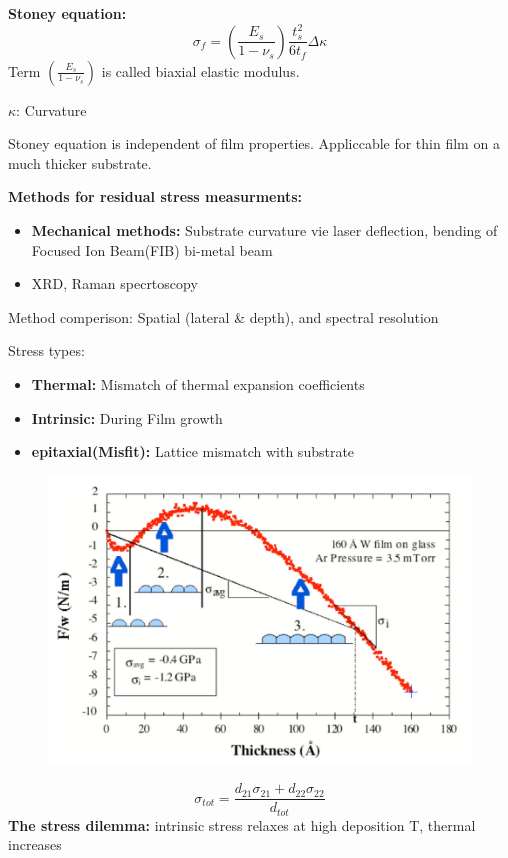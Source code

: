 \textbf{Stoney equation:}
\[
\sigma_f = \left(\frac{E_s}{1-\nu_s}\right)\frac{t^2_s}{6 t_f}\Delta \kappa
\]
Term \(\left(\frac{E_s}{1-\nu_s}\right)\) is called biaxial elastic modulus.

\(\kappa\): Curvature

Stoney equation is independent of film properties. Appliccable for thin film on a much thicker substrate.

\textbf{Methods for residual stress measurments:}
\begin{itemize}
    \item \textbf{Mechanical methods:} Substrate curvature vie laser deflection, bending of Focused Ion Beam(FIB) bi-metal beam
    \item XRD, Raman specrtoscopy 
\end{itemize}

Method comperison: Spatial (lateral \& depth), and spectral resolution

Stress types:
\begin{itemize}
    \item \textbf{Thermal:} Mismatch of thermal expansion coefficients
    \item \textbf{Intrinsic:} During Film growth
    \item \textbf{epitaxial(Misfit):} Lattice mismatch with substrate
\end{itemize}

\begin{figure}[h]
    \centering
    \includegraphics[width=\columnwidth]{images/insitu.png}
    \label{fig:insitu}
\end{figure}
\[
\sigma_{tot} = \frac{d_{21}\sigma_{21} + d_{22}\sigma_{22}}{d_{tot}}
\]
\textbf{The stress dilemma:} intrinsic stress relaxes at high deposition T, thermal increases
